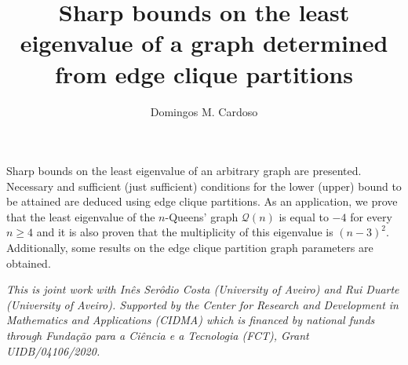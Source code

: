 \documentclass[a4paper]{amsart}
\date{}
\begin{document}
\title{Sharp bounds on the least eigenvalue of a graph determined from edge clique partitions}
\author{Domingos M. Cardoso} %
\address{Center for Research and Development in Mathematics and Applications - CIDMA, University of Aveiro} %

\maketitle


Sharp bounds on the least eigenvalue of an arbitrary graph are presented. Necessary and sufficient (just sufficient) conditions for the lower (upper) bound to be attained are deduced using edge clique partitions. As an application, we prove that the least eigenvalue of the $n$-Queens' graph $\mathcal{Q}(n)$ is equal to $-4$ for every $n \ge 4$ and it is also proven that the multiplicity of this eigenvalue is $(n-3)^2$. Additionally, some results on the edge clique partition graph parameters are obtained.
%
%
%
%

\bigskip

\emph{This is joint work with In\^es Ser\^odio Costa (University of Aveiro) and Rui Duarte (University of Aveiro).
Supported by the Center for Research and Development in Mathematics and Applications (CIDMA) which is financed by national funds through Funda\c{c}\~{a}o para a Ci\^{e}ncia e a Tecnologia (FCT), Grant UIDB/04106/2020.}
%
%
\end{document}
